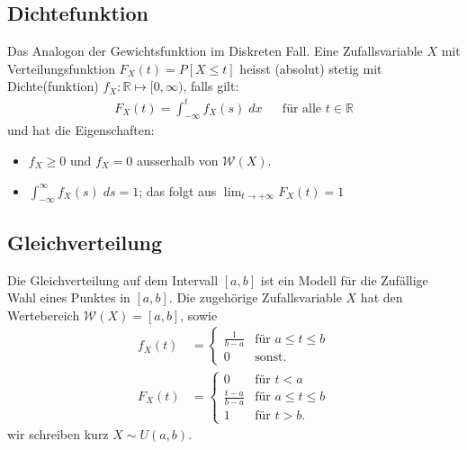 \documentclass[8pt]{extarticle}
\newcommand{\R}{\mathbb{R}}
\newcommand{\W}{\mathcal{W}}
\newcommand{\ra}{\rightarrow}
\begin{document}
\begin{multicols*}{3}
  \subsection*{Dichtefunktion}
  Das Analogon der Gewichtsfunktion im Diskreten Fall. Eine Zufallsvariable
  $X$ mit Verteilungsfunktion $F_X(t) = P[X \leq t]$ heisst (absolut)
  stetig mit Dichte(funktion) $f_X : \R \mapsto [0, \infty)$, falls gilt:
  \begin{align*}
    F_X(t) = \int_{-\infty}^t f_X(s) \; dx &  & \text{für alle } t \in \R
  \end{align*}
  und hat die Eigenschaften:
  \begin{itemize}
    \item $f_X \geq 0$ und $f_X = 0$ ausserhalb von $\W(X)$.
    \item $\int_{-\infty}^\infty f_X(s) \; ds = 1$;
          das folgt aus $\lim_{t \ra + \infty} F_X(t) = 1$
  \end{itemize}
  \subsection*{Gleichverteilung}
  Die Gleichverteilung auf dem Intervall $[a, b]$ ist ein Modell für
  die Zufällige Wahl eines Punktes in $[a, b]$. Die zugehörige
  Zufallsvariable $X$ hat den Wertebereich $\W(X) = [a, b]$, sowie
  \begin{align*}
    f_X(t) & =
    \begin{cases}
      \frac{1}{b-a} & \text{für } a \leq t \leq b \\
      0             & \text{sonst.}
    \end{cases} \\
    F_X(t) & =
    \begin{cases}
      0               & \text{für } t < a           \\
      \frac{t-a}{b-a} & \text{für } a \leq t \leq b \\
      1               & \text{für } t > b.
    \end{cases}
  \end{align*}
  wir schreiben kurz $X \sim U(a, b)$.

\end{multicols*}
\end{document}
